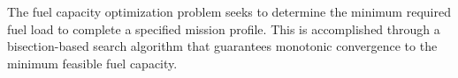The fuel capacity optimization problem seeks to determine the minimum required fuel load to complete a specified mission profile. This is accomplished through a bisection-based search algorithm that guarantees monotonic convergence to the minimum feasible fuel capacity.